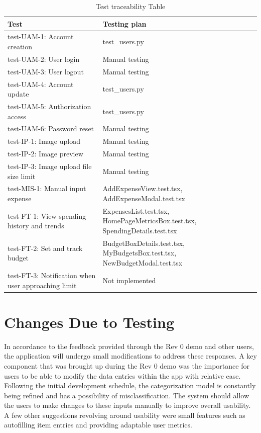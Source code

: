 \documentclass[12pt, titlepage]{article}
\begin{document}
\begin{table}[h!]
  \caption{Test traceability Table} \label{tab:unit-testing}
  \centering
  \renewcommand{\arraystretch}{1.3}
  \begin{tabular}{| m{5cm} | m{8cm} |}
      \hline
      \textbf{Test} & \textbf{Testing plan} \\
      \hline
      test-UAM-1: Account creation & test\_users.py \\
      \hline
      test-UAM-2: User login & Manual testing \\
      \hline
      test-UAM-3: User logout & Manual testing \\
      \hline
      test-UAM-4: Account update & test\_users.py \\
      \hline
      test-UAM-5: Authorization access & test\_users.py \\
      \hline
      test-UAM-6: Password reset & Manual testing \\
      \hline
      test-IP-1: Image upload & Manual testing \\
      \hline
      test-IP-2: Image preview & Manual testing \\
      \hline
      test-IP-3: Image upload file size limit & Manual testing \\
      \hline
      test-MIS-1: Manual input expense & AddExpenseView.test.tsx, AddExpenseModal.test.tsx \\
      \hline
      test-FT-1: View spending history and trends & ExpensesList.test.tsx, HomePageMetricsBox.test.tsx, SpendingDetails.test.tsx \\
      \hline
      test-FT-2: Set and track budget & BudgetBoxDetails.test.tsx, MyBudgetsBox.test.tsx, NewBudgetModal.test.tsx \\
      \hline
      test-FT-3: Notification when user approaching limit & Not implemented \\
      \hline
  \end{tabular}
\end{table}

\newpage

\section{Changes Due to Testing}

In accordance to the feedback provided through the Rev 0 demo and other users, the application will undergo small modifications to address these responses. 
A key component that was brought up during the Rev 0 demo was the importance for users to be able to modify the data entries within the app with relative ease.
Following the initial development schedule, the categorization model is constantly being refined and has a possibility of misclassification. The system should 
allow the users to make changes to these inputs manually to improve overall usability. A few other suggestions revolving around usability were small features such as
autofilling item entries and providing adaptable user metrics.\\
\end{document}
